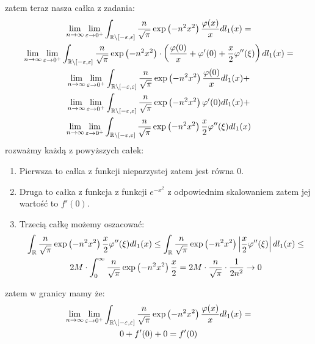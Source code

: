 \documentclass[11pt]{scrartcl}
\begin{document}
    zatem teraz nasza całka z zadania:
    \begin{gather*}
        \lim_{n \to \infty } \lim_{\varepsilon \to 0^+} 
            \int_{\mathbb R \backslash [- \varepsilon , \varepsilon]}
            \frac{n}{\sqrt{\pi } } \exp \left ( -n^2 x^2 \right ) \frac{\varphi (x)}{x} dl_1 (x) = \\
        \lim_{n \to \infty } \lim_{\varepsilon \to 0^+} 
            \int_{\mathbb R \backslash [- \varepsilon , \varepsilon]}
            \frac{n}{\sqrt{\pi } } \exp \left ( -n^2 x^2 \right ) 
            \cdot \left ( 
                \frac{\varphi (0)}{x} + 
                \varphi' (0) + 
                \frac{x}{2} \varphi''(\xi) 
            \right ) dl_1 (x) = \\
        \lim_{n \to \infty } \lim_{\varepsilon \to 0^+} 
            \int_{\mathbb R \backslash [- \varepsilon , \varepsilon]}
            \frac{n}{\sqrt{\pi } } \exp \left ( -n^2 x^2 \right ) \frac{\varphi (0)}{x} dl_1 (x) + \\
        \lim_{n \to \infty } \lim_{\varepsilon \to 0^+} 
            \int_{\mathbb R \backslash [- \varepsilon , \varepsilon]}
            \frac{n}{\sqrt{\pi } } \exp \left ( -n^2 x^2 \right ) \varphi' (0) dl_1 (x) + \\
        \lim_{n \to \infty } \lim_{\varepsilon \to 0^+} 
            \int_{\mathbb R \backslash [- \varepsilon , \varepsilon]}
            \frac{n}{\sqrt{\pi } } \exp \left ( -n^2 x^2 \right ) \frac{x}{2} \varphi''(\xi) dl_1 (x)
    \end{gather*}
    rozważmy każdą z powyższych całek:
    \begin{enumerate}
        \item Pierwsza to całka z funkcji nieparzystej zatem jest równa 0. 
        \item Druga to całka z funkcja z funkcji $e^{-x^2}$ z odpowiednim skalowaniem 
            zatem jej wartość to $f'(0)$.
        \item Trzecią całkę możemy oszacować:
            \begin{gather*}
                \int_{\mathbb R}
                    \frac{n}{\sqrt{\pi } } \exp \left ( -n^2 x^2 \right ) 
                    \frac{x}{2} \varphi''(\xi) dl_1 (x) \leq
                \int_{\mathbb R}
                    \frac{n}{\sqrt{\pi } } \exp \left ( -n^2 x^2 \right ) 
                    \left\lvert \frac{x}{2} \varphi''(\xi) \right\rvert dl_1 (x) \leq \\
                2M \cdot \int_0^{\infty}
                    \frac{n}{\sqrt{\pi } } \exp \left ( -n^2 x^2 \right ) \frac{x}{2} = 
                2M \cdot \frac{n}{\sqrt{\pi}} \cdot \frac{1}{2 n^2} \to 0
            \end{gather*}
    \end{enumerate}
    zatem w granicy mamy że:
    \begin{gather*}
        \lim_{n \to \infty } \lim_{\varepsilon \to 0^+} 
            \int_{\mathbb R \backslash [- \varepsilon , \varepsilon]}
            \frac{n}{\sqrt{\pi } } \exp \left ( -n^2 x^2 \right ) \frac{\varphi (x)}{x} dl_1 (x) = \\
            0 + f'(0) + 0 = f'(0)
    \end{gather*}
\end{document}
